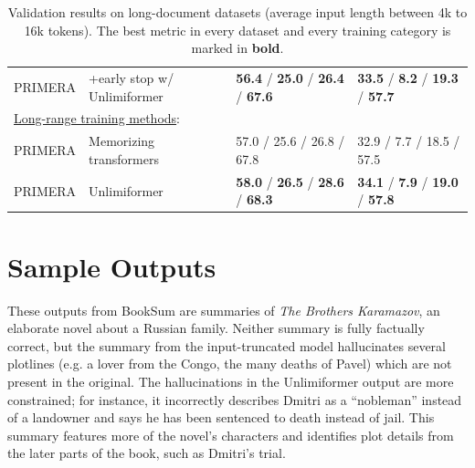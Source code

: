 \documentclass{article}
\newcommand{\ours}{Unlimiformer\xspace}
\begin{document}
\begin{table}[h]
\begin{tabular}{llll}
\textsc{PRIMERA}       & \qquad+early stop w/  \ours & \textbf{56.4} / \textbf{25.0} / \textbf{26.4} / \textbf{67.6} &     \textbf{33.5} / \textbf{8.2} / \textbf{19.3} / \textbf{57.7} \\
\multicolumn{4}{l}{\qquad\quad\underline{Long-range training methods}:} \\
\textsc{PRIMERA}    & Memorizing transformers    & 57.0 / 25.6 / 26.8 / 67.8 & 32.9 / 7.7 / 18.5 / 57.5 \\
\textsc{PRIMERA}    & \ours &  \textbf{58.0} / \textbf{26.5} / \textbf{28.6} / \textbf{68.3} & \textbf{34.1} / \textbf{7.9} / \textbf{19.0} / \textbf{57.8} \\
\bottomrule
\end{tabular} 

\caption{Validation results on long-document datasets (average input length between 4k to 16k tokens).  
The best metric in every dataset and every training category is marked in \textbf{bold}.
} 
\label{tab:small-datasets-val}
\end{table}

\label{appendix:booksum-lengths}
\section{Sample Outputs}
\label{sec:sample_output}
These outputs from BookSum are summaries of \textit{The Brothers Karamazov}, an elaborate novel about a Russian family. Neither summary is fully factually correct, but the summary from the input-truncated model hallucinates several plotlines (e.g. a lover from the Congo, the many deaths of Pavel) which are not present in the original. The hallucinations in the \ours output are more constrained; for instance, it incorrectly describes Dmitri as a ``nobleman'' instead of a landowner and says he has been sentenced to death instead of jail. This summary features more of the novel's characters and identifies plot details from the later parts of the book, such as Dmitri's trial.
\end{document}
